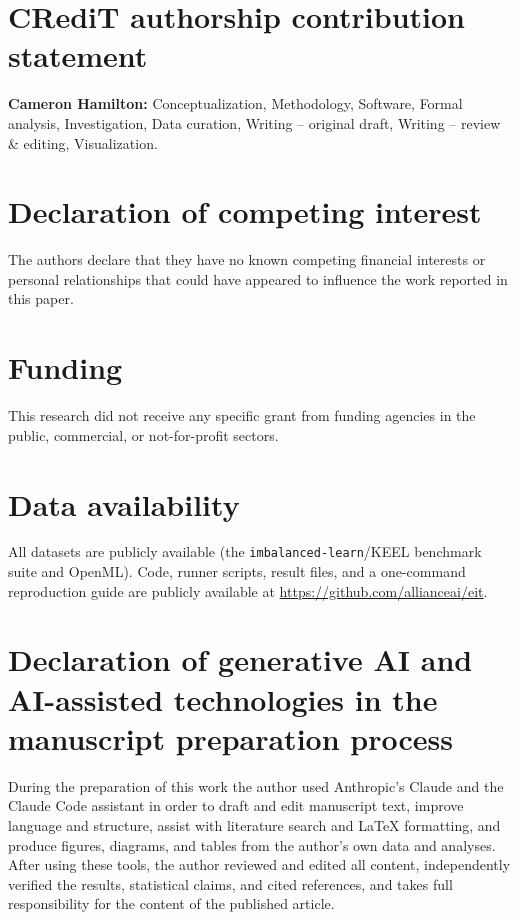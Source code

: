 \section*{CRediT authorship contribution statement}

\textbf{Cameron Hamilton:} Conceptualization, Methodology, Software, Formal
analysis, Investigation, Data curation, Writing -- original draft, Writing --
review \& editing, Visualization.

\section*{Declaration of competing interest}

The authors declare that they have no known competing financial interests or
personal relationships that could have appeared to influence the work reported in
this paper.

\section*{Funding}

This research did not receive any specific grant from funding agencies in the
public, commercial, or not-for-profit sectors.

\section*{Data availability}

All datasets are publicly available (the \texttt{imbalanced-learn}/KEEL benchmark
suite and OpenML). Code, runner scripts, result files, and a one-command
reproduction guide are publicly available at
\url{https://github.com/allianceai/eit}.

\section*{Declaration of generative AI and AI-assisted technologies in the manuscript preparation process}

During the preparation of this work the author used Anthropic's Claude and the
Claude Code assistant in order to draft and edit manuscript text, improve language
and structure, assist with literature search and \LaTeX{} formatting, and produce
figures, diagrams, and tables from the author's own data and analyses. After using
these tools, the author reviewed and edited all content, independently verified the
results, statistical claims, and cited references, and takes full responsibility for
the content of the published article.
